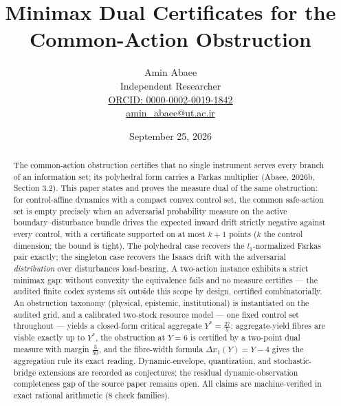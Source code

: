 \documentclass[10pt,twocolumn]{article}
\theoremstyle{definition}
\begin{document}
\title{Minimax Dual Certificates for the\\ Common-Action Obstruction}
\author{Amin Abaee\\[0.35em]
{\small Independent Researcher}\\[0.55em]
{\small\href{https://orcid.org/0000-0002-0019-1842}{ORCID: 0000-0002-0019-1842}}\\[0.3em]
{\small\href{mailto:amin\_abaee@ut.ac.ir}{amin\_abaee@ut.ac.ir}}}
\date{September 25, 2026}
\maketitle

\begin{abstract}
The common-action obstruction certifies that no single instrument serves
every branch of an information set; its polyhedral form carries a Farkas
multiplier (Abaee, 2026b, Section 3.2). This paper states and proves the
measure dual of the same obstruction: for control-affine dynamics with a
compact convex control set, the common safe-action set is empty precisely
when an adversarial probability measure on the active
boundary--disturbance bundle drives the expected inward drift strictly
negative against every control, with a certificate supported on at most
$k+1$ points ($k$ the control dimension; the bound is tight). The
polyhedral case recovers the $l_1$-normalized Farkas pair exactly; the
singleton case recovers the Isaacs drift with the adversarial
\emph{distribution} over disturbances load-bearing. A two-action instance
exhibits a strict minimax gap: without convexity the equivalence fails and
no measure certifies --- the audited finite codex systems sit outside this
scope by design, certified combinatorially. An obstruction taxonomy
(physical, epistemic, institutional) is instantiated on the audited grid,
and a calibrated two-stock resource model --- one fixed control set
throughout --- yields a closed-form critical aggregate
$Y^{*} = \tfrac{27}{5}$: aggregate-yield fibres are viable exactly up to
$Y^{*}$, the obstruction at $Y = 6$ is certified by a two-point dual
measure with margin $\tfrac{3}{50}$, and the fibre-width formula
$\Delta x_{1}(Y) = Y - 4$ gives the aggregation rule its exact reading.
Dynamic-envelope, quantization, and stochastic-bridge extensions are
recorded as conjectures; the residual dynamic-observation completeness gap
of the source paper remains open. All claims are machine-verified in exact
rational arithmetic (8 check families).
\end{abstract}
\end{document}

